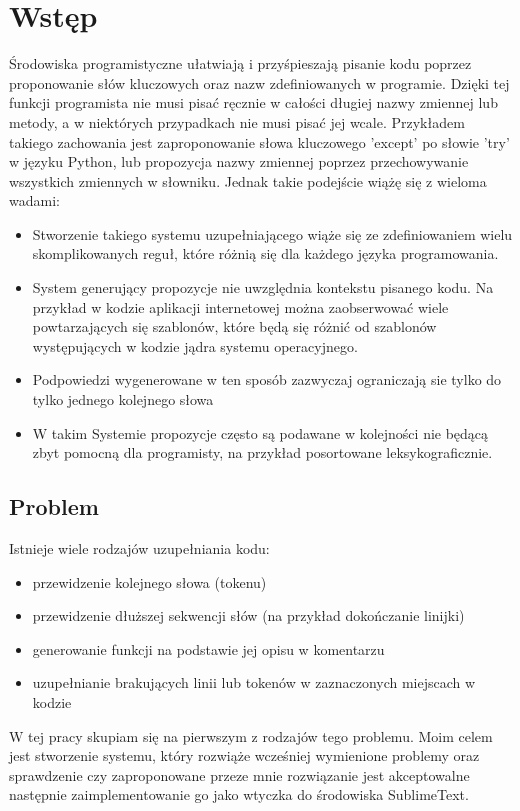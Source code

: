 \newpage %
\section{Wstęp}
Środowiska programistyczne ułatwiają i przyśpieszają pisanie kodu poprzez proponowanie 
słów kluczowych oraz nazw zdefiniowanych w programie. Dzięki tej funkcji programista nie musi pisać ręcznie 
w całości długiej nazwy zmiennej lub metody, a w niektórych przypadkach nie musi pisać jej wcale. 
Przykładem takiego zachowania jest zaproponowanie słowa kluczowego 'except' po słowie 'try' w języku Python,
lub propozycja nazwy zmiennej poprzez przechowywanie wszystkich zmiennych w słowniku.  
Jednak takie podejście wiążę się z wieloma wadami: 
\begin{itemize}
	\item Stworzenie takiego systemu uzupełniającego wiąże się ze zdefiniowaniem wielu skomplikowanych
	reguł, które różnią się dla każdego języka programowania. 
	\item System generujący propozycje nie uwzględnia kontekstu pisanego kodu. Na przykład w kodzie 
	aplikacji internetowej można zaobserwować wiele powtarzających się szablonów, które będą się różnić 
	od szablonów występujących w kodzie jądra systemu operacyjnego. 
	\item Podpowiedzi wygenerowane w ten sposób zazwyczaj ograniczają sie tylko do tylko jednego kolejnego słowa 
	\item W takim Systemie propozycje często są podawane w kolejności nie będącą zbyt pomocną dla programisty, 
	na przykład posortowane leksykograficznie. 
\end{itemize}

\subsection {Problem}
Istnieje wiele rodzajów uzupełniania kodu: 
\begin{itemize}
	\item przewidzenie kolejnego słowa (tokenu) 
	\item przewidzenie dłuższej sekwencji słów (na przykład dokończanie linijki)
	\item generowanie funkcji na podstawie jej opisu w komentarzu
	\item uzupełnianie brakujących linii lub tokenów w zaznaczonych miejscach w kodzie
\end{itemize}
W tej pracy skupiam się na pierwszym z rodzajów tego problemu. Moim celem jest stworzenie systemu, który rozwiąże 
wcześniej wymienione problemy oraz sprawdzenie czy zaproponowane przeze mnie rozwiązanie jest akceptowalne następnie 
zaimplementowanie go jako wtyczka do środowiska SublimeText. 

